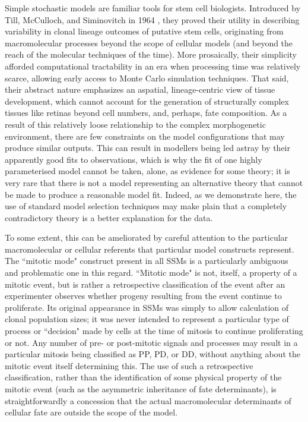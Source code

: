 Simple stochastic models are familiar tools for stem cell biologists. Introduced by Till, McCulloch, and Siminovitch in 1964 \cite{Till1964}, they proved their utility in describing variability in clonal lineage outcomes of putative stem cells, originating from macromolecular processes beyond the scope of cellular models (and beyond the reach of the molecular techniques of the time). More prosaically, their simplicity afforded computational tractability in an era when processing time was relatively scarce, allowing early access to Monte Carlo simulation techniques. That said, their abstract nature emphasizes an aspatial, lineage-centric view of tissue development, which cannot account for the generation of structurally complex tissues like retinas beyond cell numbers, and, perhaps, fate composition. As a result of this relatively loose relationship to the complex morphogenetic environment, there are few constraints on the model configurations that may produce similar outputs. This can result in modellers being led astray by their apparently good fits to observations, which is why the fit of one highly parameterised model cannot be taken, alone, as evidence for some theory; it is very rare that there is not a model representing an alternative theory that cannot be made to produce a reasonable model fit. Indeed, as we demonstrate here, the use of standard model selection techniques may make plain that a completely contradictory theory is a better explanation for the data.

To some extent, this can be ameliorated by careful attention to the particular macromolecular or cellular referents that particular model constructs represent. The ``mitotic mode" construct present in all SSMs is a particularly ambiguous and problematic one in this regard. ``Mitotic mode" is not, itself, a property of a mitotic event, but is rather a retrospective classification of the event after an experimenter observes whether progeny resulting from the event continue to proliferate. Its original appearance in SSMs was simply to allow calculation of clonal population sizes; it was never intended to represent a particular type of process or ``decision" made by cells at the time of mitosis to continue proliferating or not. Any number of pre- or post-mitotic signals and processes may result in a particular mitosis being classified as PP, PD, or DD, without anything about the mitotic event itself determining this. The use of such a retrospective classification, rather than the identification of some physical property of the mitotic event (such as the asymmetric inheritance of fate determinants), is straightforwardly a concession that the actual macromolecular determinants of cellular fate are outside the scope of the model.

